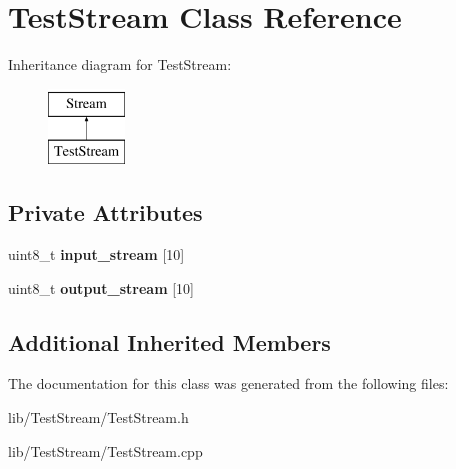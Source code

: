 \hypertarget{class_test_stream}{\section{Test\-Stream Class Reference}
\label{class_test_stream}
}
Inheritance diagram for Test\-Stream\-:\begin{figure}[H]
\begin{center}
\leavevmode
\includegraphics[height=2.000000cm]{class_test_stream}
\end{center}
\end{figure}
\subsection*{Private Attributes}
\begin{DoxyCompactItemize}
\item 
\hypertarget{class_test_stream_a4fbf64a4b85e5973859e849bf0799456}{uint8\-\_\-t {\bfseries input\-\_\-stream} \mbox{[}10\mbox{]}}\label{class_test_stream_a4fbf64a4b85e5973859e849bf0799456}

\item 
\hypertarget{class_test_stream_aa211bf4c182b5304ee2f841379e23f96}{uint8\-\_\-t {\bfseries output\-\_\-stream} \mbox{[}10\mbox{]}}\label{class_test_stream_aa211bf4c182b5304ee2f841379e23f96}

\end{DoxyCompactItemize}
\subsection*{Additional Inherited Members}


The documentation for this class was generated from the following files\-:\begin{DoxyCompactItemize}
\item 
lib/\-Test\-Stream/Test\-Stream.\-h\item 
lib/\-Test\-Stream/Test\-Stream.\-cpp\end{DoxyCompactItemize}
